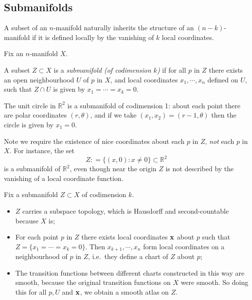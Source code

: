 \documentclass[a4paper,11pt]{article}
\begin{document}
	\subsection{Submanifolds} 

	A subset of an $n$-manifold naturally inherits the structure of an $(n-k)$-manifold if it is defined locally by the vanishing of $k$ local coordinates.

	Fix an $n$-manifold $X$.

	\begin{defi}
		A subset $Z \subset X$ is a \emph{submanifold (of codimension $k$)} if for all $p$ in $Z$ there exists an open neighbourhood $U$ of $p$ in $X$, and local coordinates $x_1, \cdots, x_n$ defined on $U$, such that $Z \cap U$ is given by $x_1 = \cdots = x_k = 0$.
	\end{defi}


	\begin{ex}
		The unit circle in $\mathbb{R}^2$ is a submanifold of codimension 1: about each point there are polar coordinates $(r,\theta)$, and if we take $(x_1,x_2) = (r-1,\theta)$ then the circle is given by $x_1 = 0$.
	\end{ex}

	\begin{rmk}
		Note we require the existence of nice coordinates about each $p$ in $Z$, \emph{not} each $p$ in $X$. For instance, the set
		\[
			Z : = \{(x,0): x\neq 0\} \subset \mathbb{R}^2
		\]
		is a submanifold of $\mathbb{R}^2$, even though near the origin $Z$ is not described by the vanishing of a local coordinate function.
	\end{rmk}

	Fix a submanifold $Z \subset X$ of codimension $k$.

	\begin{itemize}
		\item $Z$ carries a subspace topology, which is Hausdorff and second-countable because $X$ is;
		\item For each point $p$ in $Z$ there exists local coordinates $\vb x$ about $p$ such that $Z = \{x_1 = \cdots = x_k = 0\}$. Then $x _{k+1}, \cdots, x_n$ form local coordinates on a neighbourhood of $p$ in $Z$, i.e.\ they define a chart of $Z$ about $p$;
		\item The transition functions between different charts constructed in this way are smooth, because the original transition functions on $X$ were smooth. So doing this for all $p,U$ and $\vb x$, we obtain a smooth atlas on $Z$.
	\end{itemize}
\end{document}
